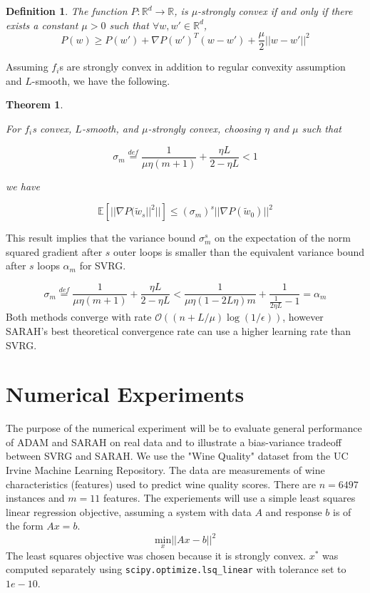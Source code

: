 \documentclass[letterpaper,11 pt]{article}
\newtheorem{theorem}{Theorem}
\newtheorem{definition}{Definition}
\begin{document}
\begin{definition}\label{def:sconvex}
The function $P:\mathbb{R}^{d} \rightarrow \mathbb{R}$, is $\mu$-strongly convex if and only if there exists a constant $\mu > 0$ such that $\forall w,w' \in \mathbb{R}^{d}$,
\[
P(w) \geq P(w') + \nabla P(w')^{T} (w-w') + \frac{\mu}{2} ||w - w' ||^{2}
\]
\end{definition}

Assuming $f_{i}$s are strongly convex in addition to regular convexity assumption and $L$-smooth, we have the following.

\begin{theorem}\label{thm:sarvar}

For $f_{i}$s convex, $L$-smooth, and $\mu$-strongly convex, choosing $\eta$ and $\mu$ such that

\begin{equation}\label{eq:sarvar}
\sigma_{m}\stackrel{def}{=}\frac{1}{\mu\eta(m+1)}+\frac{\eta L}{2-\eta L}<1
\end{equation}

we have

\[
\mathbb{E}[||\nabla P(\tilde{w}_{s}||^{2}||] \leq  (\sigma_{m})^{s} || \nabla P ( \tilde{w}_{0} ) ||^{2}
\]

\end{theorem}

This result implies that the variance bound $\sigma_{m}^{s}$ on the expectation of the norm squared gradient after $s$ outer loops is smaller than the equivalent variance bound after $s$ loops $\alpha_{m}$ for SVRG.

\[
\sigma_{m}\stackrel{def}{=}\frac{1}{\mu\eta(m+1)}+\frac{\eta L}{2-\eta L}  <  \frac{1}{\mu\eta(1-2L\eta)m}+\frac{1}{\frac{1}{2\eta L}-1}=\alpha_{m}
\]
Both methods converge with rate $\mathcal{O}((n+L/\mu)\log(1/\epsilon))$, however SARAH's best theoretical convergence rate can use a higher learning rate than SVRG.

\section{Numerical Experiments}\label{sec:num}

The purpose of the numerical experiment will be to evaluate general performance of ADAM and SARAH on real data and to illustrate a bias-variance tradeoff between SVRG and SARAH.
We use the "Wine Quality" \cite{winequality} dataset from the UC Irvine Machine Learning Repository. The data are measurements of wine characteristics (features) used to predict wine quality scores. There are $n=6497$ instances and $m=11$ features. The experiements will use a simple least squares linear regression objective, assuming a system with data $A$ and response $b$ is of the form $Ax=b$.
\[
\underset{x}{\text{min}}||Ax-b||^{2}
\]
The least squares objective was chosen because it is strongly convex.  $x^*$ was computed separately using \verb|scipy.optimize.lsq_linear| with tolerance set to $1e-10$.  
\end{document}
